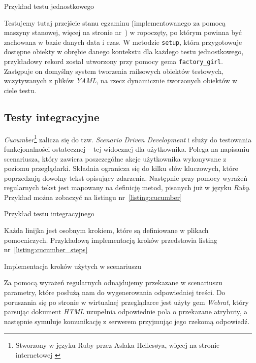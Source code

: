 \documentclass[a4paper,12pt]{article}
\begin{document}
\begin{listing}
  
  \caption{Przykład testu jednostkowego}
  \label{listing:shoulda}
\end{listing}


Testujemy tutaj przejście stanu egzaminu (implementowanego za pomocą maszyny stanowej,
więcej na stronie nr~\pageref{sec:state_machine}) w ropoczęty, po którym powinna być
zachowana w bazie danych data i czas. W metodzie \texttt{setup}, która przygotowuje
dostępne obiekty w obrębie danego kontekstu dla każdego testu jednostkowego, przykładowy
rekord został utworzony przy pomocy gema \texttt{factory\_girl}. Zastępuje on domyślny
system tworzenia railsowych obiektów testowych, wczytywanych z plików \emph{YAML}, na
rzecz dynamicznie tworzonych obiektów w ciele testu.

\subsection{Testy integracyjne}
\emph{Cucumber}\footnote{Stworzony w języku Ruby przez Aslaka Hellesøya, więcej na stronie
internetowej \cite{cucumber}} zalicza się do tzw. \emph{Scenario Driven Development} i
służy do testowania funkcjonalności ostatecznej -- tej widocznej dla użytkownika. Polega
na napisaniu scenariusza, który zawiera poszczególne akcje użytkownika wykonywane z
poziomu przeglądarki. Składnia ogranicza się do kilku słów kluczowych, które poprzedzają
dowolny tekst opisujący zdarzenia. Następnie przy pomocy wyrażeń regularnych tekst jest
mapowany na definicję metod, pisanych już w języku \emph {Ruby}. Przykład można zobaczyć
na listingu nr~\ref{listing:cucumber}

\begin{listing}
  
  \caption{Przykład testu integracyjnego}
  \label{listing:cucumber}
\end{listing}


Każda linijka jest osobnym krokiem, które są definiowane w plikach pomocniczych.
Przykładową implementacją kroków przedstawia listing nr~\ref{listing:cucumber_steps}

\begin{listing}
  
  \caption{Implementacja kroków użytych w scenariuszu}
  \label{listing:cucumber_steps}
\end{listing}


Za pomocą wyrażeń regularnych odnajdujemy przekazane w scenariuszu parametry, które
posłużą nam do wygenerowania odpowiedniej treści. Do poruszania się po stronie w
wirtualnej przeglądarce jest użyty gem \emph{Webrat}, który parsując dokument
\emph{HTML} uzupełnia odpowiednie pola o przekazane atrybuty, a następnie symuluje
komunikację z serwerem przyjmując jego rzekomą odpowiedź.
\end{document}
